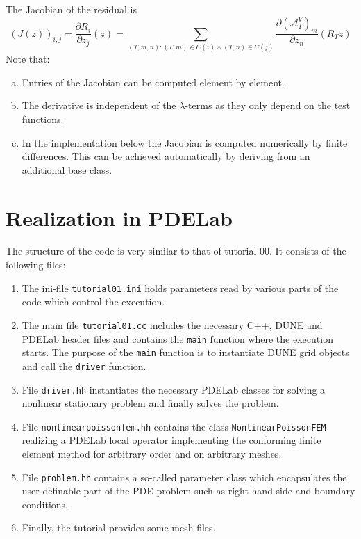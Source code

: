 \documentclass[a4paper,12pt]{article}
\begin{document}
The Jacobian of the residual is
\begin{equation*}
(J(z))_{i,j} = \frac{\partial R_i}{\partial z_j} (z) =
\sum_{(T,m,n) : (T,m)\in C(i) \wedge (T,n)\in C(j)} \frac{\partial (\mathcal{A}_T^V)_m}{\partial z_n}
(R_T z)
\end{equation*}
Note that:
\begin{enumerate}[a)]
\item Entries of the Jacobian can be computed element by element.
\item The derivative is independent of the $\lambda$-terms as
they only depend on the test functions.
\item In the implementation below the Jacobian is computed numerically
by finite differences. This can be achieved automatically by deriving from an
additional base class.
\end{enumerate}

\section{Realization in PDELab}

The structure of the code is very similar to that of tutorial 00. It consists of the following
files:
\begin{enumerate}[1)]
\item The ini-file
\lstinline{tutorial01.ini} holds parameters read by various parts of the code
which control the execution. 
\item The main file \lstinline{tutorial01.cc} includes the necessary C++,
DUNE and PDELab header files
and contains the \lstinline{main} function where the execution starts. 
The purpose of the \lstinline{main} function is
to instantiate DUNE grid objects and call the \lstinline{driver} function.
\item File \lstinline{driver.hh} instantiates the necessary PDELab classes 
for solving a nonlinear stationary problem and finally solves the problem.
\item File \lstinline{nonlinearpoissonfem.hh} contains the class
\lstinline{NonlinearPoissonFEM} realizing a PDELab local operator implementing
the conforming finite element method for arbitrary order and on arbitrary meshes.
\item File \lstinline{problem.hh} contains a so-called parameter class which
encapsulates the user-definable part of the PDE problem such as right hand
side and boundary conditions.
\item Finally, the tutorial provides some mesh files.
\end{enumerate}
\end{document}
